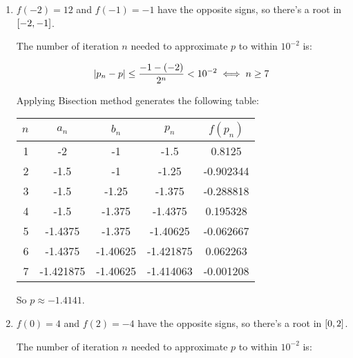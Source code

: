 \documentclass[../../../../Assignments.tex]{subfiles}
\begin{document}
\begin{solution}
    \begin{enumerate}[label = (\alph*)]
        \item \(f(-2) = 12\) and \(f(-1) = -1\) have the opposite signs, so
            there's a root in \(\interval{-2}{-1}\).

            The number of iteration \(n\) needed to approximate \(p\) to within
            \(10^{-2}\) is:

            \[\abs{p_n - p} \leq \frac{-1 - (-2)}{2^n} < 10^{-2} \iff n \geq 7\]

            Applying Bisection method generates the following table:

            \begin{table}[H]
                \centering
                \begin{tabular}{r S[table-format=-1.6] S[table-format=-1.5] S[table-format=-1.6] S[table-format=-1.6]}
                    \toprule
                    \(n\)  &  {\(a_n\)}  &  {\(b_n\)}  &  {\(p_n\)}  &  {\(f(p_n)\)}  \\
                      &  -2         &  -1         &  -1.5       &   0.8125       \\
                        2  &  -1.5       &  -1         &  -1.25      &  -0.902344     \\
                        3  &  -1.5       &  -1.25      &  -1.375     &  -0.288818     \\
                        4  &  -1.5       &  -1.375     &  -1.4375    &   0.195328     \\
                        5  &  -1.4375    &  -1.375     &  -1.40625   &  -0.062667     \\
                        6  &  -1.4375    &  -1.40625   &  -1.421875  &   0.062263     \\
                        7  &  -1.421875  &  -1.40625   &  -1.414063  &  -0.001208     \\
                    \bottomrule
                \end{tabular}
            \end{table}

            So \(p \approx \num{-1.4141}\).

        \item \(f(0) = 4\) and \(f(2) = -4\) have the opposite signs, so there's
            a root in \(\interval{0}{2}\).

            The number of iteration \(n\) needed to approximate \(p\) to within
            \(10^{-2}\) is:


\end{enumerate}
\end{solution}
\end{document}
